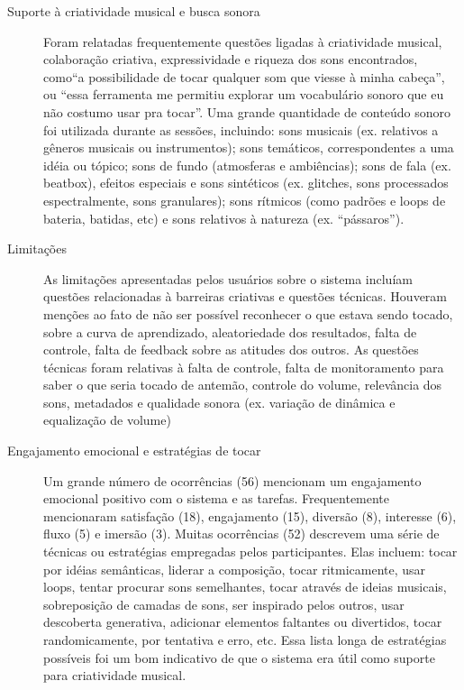 \begin{description}
\item[Suporte à criatividade musical e busca sonora] Foram relatadas frequentemente questões ligadas à criatividade musical, colaboração criativa, expressividade e riqueza dos sons encontrados, como``a possibilidade de tocar qualquer som que viesse à minha cabeça'', ou ``essa ferramenta me permitiu explorar um vocabulário sonoro que eu não costumo usar pra tocar''. Uma grande quantidade de conteúdo sonoro foi utilizada durante as sessões, incluindo: sons musicais (ex. relativos a gêneros musicais ou instrumentos); sons temáticos, correspondentes a uma idéia ou tópico; sons de fundo (atmosferas e ambiências); sons de fala (ex. beatbox), efeitos especiais e sons sintéticos (ex. glitches, sons processados espectralmente, sons granulares); sons rítmicos (como padrões e loops de bateria, batidas, etc) e sons relativos à natureza (ex. ``pássaros'').

\item[Limitações] As limitações apresentadas pelos usuários sobre o sistema incluíam questões relacionadas à barreiras criativas e questões técnicas. Houveram menções ao fato de não ser possível reconhecer o que estava sendo tocado, sobre a curva de aprendizado, aleatoriedade dos resultados, falta de controle, falta de feedback sobre as atitudes dos outros. As questões técnicas foram relativas à falta de controle, falta de monitoramento para saber o que seria tocado de antemão, controle do volume, relevância dos sons, metadados e qualidade sonora (ex. variação de dinâmica e equalização de volume)

\item[Engajamento emocional e estratégias de tocar] Um grande número de ocorrências (56) mencionam um engajamento emocional positivo com o sistema e as tarefas. Frequentemente mencionaram satisfação (18), engajamento (15), diversão (8), interesse (6), fluxo (5) e imersão (3). Muitas ocorrências (52) descrevem uma série de técnicas ou estratégias empregadas pelos participantes. Elas incluem: tocar por idéias semânticas, liderar a composição, tocar ritmicamente, usar loops, tentar procurar sons semelhantes, tocar através de ideias musicais, sobreposição de camadas de sons, ser inspirado pelos outros, usar descoberta generativa, adicionar elementos faltantes ou divertidos, tocar randomicamente, por tentativa e erro, etc. Essa lista longa de estratégias possíveis foi um bom indicativo de que o sistema era útil como suporte para criatividade musical. 


\end{description}
